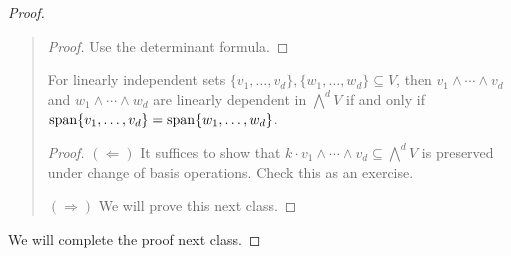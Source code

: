 \begin{proof}
\begin{quote}
    \begin{proof}
      Use the determinant formula.
    \end{proof}

    \begin{lemma}
      For linearly independent
      sets $\{v_1, \dots, v_d\}, \{w_1, \dots, w_d\} \subseteq V$,
      then $v_1 \wedge \cdots \wedge v_d$
      and $w_1 \wedge \cdots \wedge w_d$
      are linearly dependent in
      $\bigwedge^d V$ if and only if
      $\operatorname{span}\{v_1, \dots, v_d\} = \operatorname{span}\{w_1, \dots, w_d\}$.
    \end{lemma}

    \begin{proof}
      $(\Leftarrow)$ It suffices to show
      that $k \cdot v_1 \wedge \cdots \wedge v_d \subseteq \bigwedge^d V$
      is preserved under change of basis operations.
      Check this as an exercise.

      $(\Rightarrow)$
      We will prove this next class.
    \end{proof}
  \end{quote}
  We will complete the proof next class.
\end{proof}
